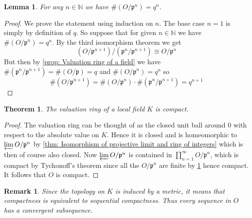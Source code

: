 \documentclass{article}
\newtheorem{theorem}{Theorem}[section]
\newtheorem{lemma}{Lemma}[section]
\newtheorem{remark}{Remark}[section]
\newcommand{\mfrak}[1]{\mathfrak{#1}}
\newcommand{\mbb}[1]{\mathbb{#1}}
\numberwithin{equation}{section}
\begin{document}
\begin{lemma}\label{lem: Valuation ring mod power of prime is finite in local field}
    For any $n \in \mbb N$ we have $\# (O / \mfrak p^n) = q^n$.
\end{lemma}

\begin{proof}
    We prove the statement using induction on $n$. The base case $n = 1$ is simply by definition of $q$. So suppose that for given $n \in \mbb N$ we have $\# (O / \mfrak p^n) = q^n$. By the third isomorphism theorem we get
    $$(O / \mfrak p^{n+1}) / (\mfrak p^n / \mfrak p^{n+1}) \cong O / \mfrak p^{n}$$
    But then by \cref{prop: Valuation ring of a field} we have $\# (\mfrak p^n / \mfrak p^{n+1}) = \# (O /\mfrak p) = q$ and $\#(O / \mfrak p^{n}) = q^n$ so $$\# (O / \mfrak p^{n+1}) = \# (O / \mfrak p^{n}) \cdot \# (\mfrak p^n / \mfrak p^{n+1}) = q^{n+1}$$
\end{proof}






\begin{theorem} \label{thm: Valuation ring in local field is compact}
    The valuation ring of a local field $K$ is compact.
\end{theorem}
\begin{proof}
    The valuation ring can be thought of as the closed unit ball around 0 with respect to the absolute value on $K$. Hence it is closed and is homeomorphic to $\varprojlim O / \mfrak p^n$ by \cref{thm: Isomorphism of projective limit and ring of integers} which is then of course also closed. Now $\varprojlim O / \mfrak p^n$ is contained in $\prod_{n = 1}^\infty O / \mfrak p^n$, which is compact by Tychonoff's theorem since all the $O / \mfrak p^n$ are finite by \cref{lem: Valuation ring mod power of prime is finite in local field} hence compact. It follows that $O$ is compact.
\end{proof}
\begin{remark}\label{rem: Compactness is equivalent to sequential compactness}
    Since the topology on $K$ is induced by a metric, it means that compactness is equivalent to sequential compactness. Thus every sequence in $O$ has a convergent subsequence.
\end{remark}
\end{document}
